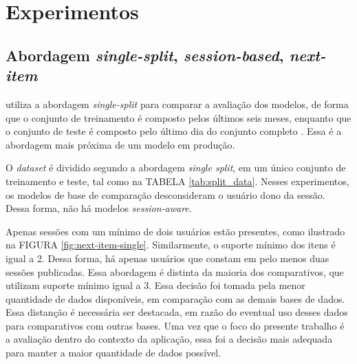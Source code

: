   \newpage
  \section{Experimentos} 


\subsection{Abordagem \textit{single-split}, \textit{session-based}, \textit{next-item}}

\citet{HidasiKBT15} utiliza a abordagem \textit{single-split} para comparar a
avaliação dos modelos, de forma que o conjunto de treinamento é composto pelos
últimos seis meses, enquanto que o conjunto de teste é composto pelo último dia
do conjunto completo \cite{ludewig_2018}. Essa é a abordagem mais próxima de um
modelo em produção.

O \textit{dataset} é dividido segundo a abordagem \textit{single split}, em um
único conjunto de treinamento e teste, tal como na TABELA
\ref{tab:split_data}. Nesses experimentos, os modelos de base de comparação
desconsideram o usuário dono da sessão. Dessa forma, não há modelos
\textit{session-aware}.

Apenas sessões com um mínimo de dois usuários estão presentes, como ilustrado na
FIGURA \ref{fig:next-item-single}. Similarmente, o suporte mínimo dos itens é
igual a 2. Dessa forma, há apenas usuários que constam em pelo menos duas
sessões publicadas. Essa abordagem é distinta da maioria dos comparativos, que
utilizam suporte mínimo igual a 3. Essa decisão foi tomada pela menor quantidade
de dados disponíveis, em comparação com as demais bases de dados. Essa distanção
é necessária ser destacada, em razão do eventual uso desses dados
para comparativos com outras bases. Uma vez que o foco do presente trabalho é a
avaliação dentro do contexto da aplicação, essa foi a decisão mais adequada para
manter a maior quantidade de dados possível.

